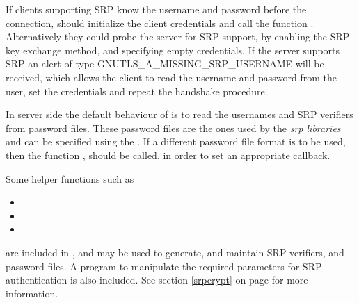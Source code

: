 If clients supporting SRP know the username and password before the connection,
should initialize the client credentials and call the
function .
Alternatively they could probe the server for SRP support, by enabling
the SRP key exchange method, and specifying empty credentials. If the server
supports SRP an alert of type GNUTLS\_A\_MISSING\_SRP\_USERNAME will be
received, which allows the client to read the username and password from the 
user, set the credentials and repeat the handshake procedure.
\par
In server side the default behaviour of \gnutls{} is to read the usernames 
and SRP verifiers from password files. These password files are the ones used
by the \emph{srp libraries} and can be specified using the
.
If a different password file format is to be used, then the 
function ,
should be called, in order to set an appropriate callback.
\par
Some helper functions such as
\begin{itemize}
\item {}
\item {}
\item {}
\end{itemize}
are included in \gnutls{}, and may be used to generate, and maintain
SRP verifiers, and password files. 
A program to manipulate the required parameters 
for SRP authentication is also included. See section \ref{srpcrypt} on 
page \pageref{srpcrypt} for more information.

